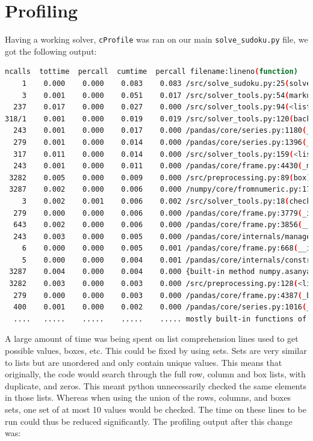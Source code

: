 \documentclass[12pt]{report} %
\begin{document}
\section{Profiling}


Having a working solver, \texttt{cProfile} was ran on our main \texttt{solve\_sudoku.py} file, we got the following output:


\begin{lstlisting}[language=Bash,caption={First profiling output}, basicstyle=\tiny]
ncalls  tottime  percall  cumtime  percall filename:lineno(function)
    1    0.000    0.000    0.083    0.083 /src/solve_sudoku.py:25(solve_sudoku
    3    0.001    0.000    0.051    0.017 /src/solver_tools.py:54(markup)
  237    0.017    0.000    0.027    0.000 /src/solver_tools.py:94(<listcomp>)
318/1    0.001    0.000    0.019    0.019 /src/solver_tools.py:120(backtrack_alg)
  243    0.001    0.000    0.017    0.000 /pandas/core/series.py:1180(__setitem__)
  279    0.001    0.000    0.014    0.000 /pandas/core/series.py:1396(_maybe_update_cacher)
  317    0.011    0.000    0.014    0.000 /src/solver_tools.py:159(<listcomp>)
  243    0.001    0.000    0.011    0.000 /pandas/core/frame.py:4430(_maybe_cache_changed)
 3282    0.005    0.000    0.009    0.000 /src/preprocessing.py:89(box)
 3287    0.002    0.000    0.006    0.000 /numpy/core/fromnumeric.py:1768(ravel)
    3    0.002    0.001    0.006    0.002 /src/solver_tools.py:18(check_sudoku)
  279    0.000    0.000    0.006    0.000 /pandas/core/frame.py:3779(_ixs)
  643    0.002    0.000    0.006    0.000 /pandas/core/frame.py:3856(__getitem__)
  243    0.003    0.000    0.005    0.000 /pandas/core/internals/managers.py:1045(iset)
    6    0.000    0.000    0.005    0.001 /pandas/core/frame.py:668(__init__)
    5    0.000    0.000    0.004    0.001 /pandas/core/internals/construction.py:423(dict_to_mgr)
 3287    0.004    0.000    0.004    0.000 {built-in method numpy.asanyarray}
 3282    0.003    0.000    0.003    0.000 /src/preprocessing.py:128(<listcomp>)
  279    0.000    0.000    0.003    0.000 /pandas/core/frame.py:4387(_box_col_values)
  400    0.001    0.000    0.002    0.000 /pandas/core/series.py:1016(__getitem__)
  ....   .....    .....    .....    ..... mostly built-in functions of packages
\end{lstlisting}

A large amount of time was being spent on list comprehension lines used to get possible values, boxes, etc. This could be fixed by using sets. Sets are very similar to lists but are unordered and only contain unique values\cite{freecodecamp_python_set_vs_list}. This means that originally, the code would search through the full row, column and box lists, with duplicate, and zeros. This meant python unnecessarily checked the same elements in those lists. Whereas when using the union of the rows, columns, and boxes sets, one set of at most 10 values would be checked. The time on these lines to be run could thus be reduced significantly. The profiling output after this change was:
\end{document}
